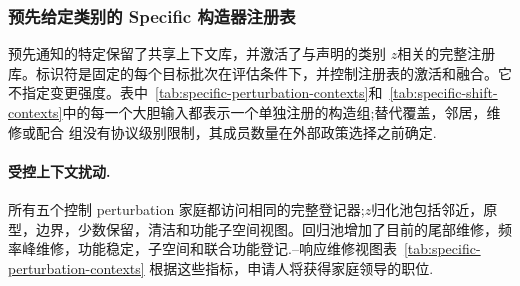 \subsubsection{预先给定类别的 Specific 构造器注册表}

预先通知的特定保留了共享上下文库，并激活了与声明的类别 $z$相关的完整注册库。标识符是固定的每个目标批次在评估条件下，并控制注册表的激活和融合。它不指定变更强度。表中~\ref{tab:specific-perturbation-contexts}和~\ref{tab:specific-shift-contexts}中的每一个大胆输入都表示一个单独注册的构造组;替代覆盖，邻居，维修或配合
组没有协议级别限制，其成员数量在外部政策选择之前确定.

\paragraph{受控上下文扰动.}所有五个控制 perturbation 家庭都访问相同的完整登记器;$z$归化池包括邻近，原型，边界，少数保留，清洁和功能子空间视图。回归池增加了目前的尾部维修，频率峰维修，功能稳定，子空间和联合功能登记.--响应维修视图表~\ref{tab:specific-perturbation-contexts}
根据这些指标，申请人将获得家庭领导的职位.

